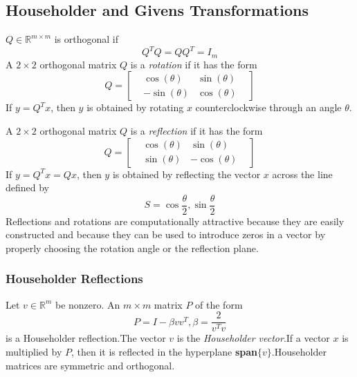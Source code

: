 \subsection{Householder and Givens Transformations}\label{subsec:-householder-givens-transformations}
$Q\in\mathbb{R}^{m\times m} $ is orthogonal if
\[
    Q^T Q = Q Q^T = I_m
\]
A $2\times 2$ orthogonal matrix $Q$ is a \textit{rotation} if it has the form
\[
    Q =
    \begin{bmatrix}
        & \cos(\theta) & \sin (\theta) &\\
        & -\sin(\theta) & \cos(\theta) &
    \end{bmatrix}
\]
If $ y = Q^T x $, then $y$ is obtained by rotating $x$ counterclockwise through an angle $\theta$.
\par A $2\times 2$ orthogonal matrix $Q$ is a \textit{reflection} if it has the form
\[
    Q =
    \begin{bmatrix}
        & \cos(\theta) & \sin (\theta) &\\
        & \sin(\theta) & -\cos(\theta) &
    \end{bmatrix}
\]
If $ y = Q^T x = Qx$, then $y$ is obtained by reflecting the vector $x$ across the line defined by
\[
    S = \cos{\frac{\theta}{2}}, \sin{\frac{\theta}{2}}
\]
Reflections and rotations are computationally attractive because they are easily constructed and because they can be
used to introduce zeros in a vector by properly choosing the rotation angle or the reflection plane.

\subsubsection{Householder Reflections}\label{subsubsec:-househoulder-reflection}
Let $v\in\mathbb{R}^m$ be nonzero. An $m\times m $ matrix $P$ of the form
\[
    P = I - \beta vv^T, \beta = \frac{2}{v^T v}
\]
is a Householder reflection.The vector $v$ is the \textit{Householder vector}.If a vector $x$ is multiplied by $P$, then
it is reflected in the hyperplane \textbf{span}$\{v\}$.Householder matrices are symmetric and orthogonal.